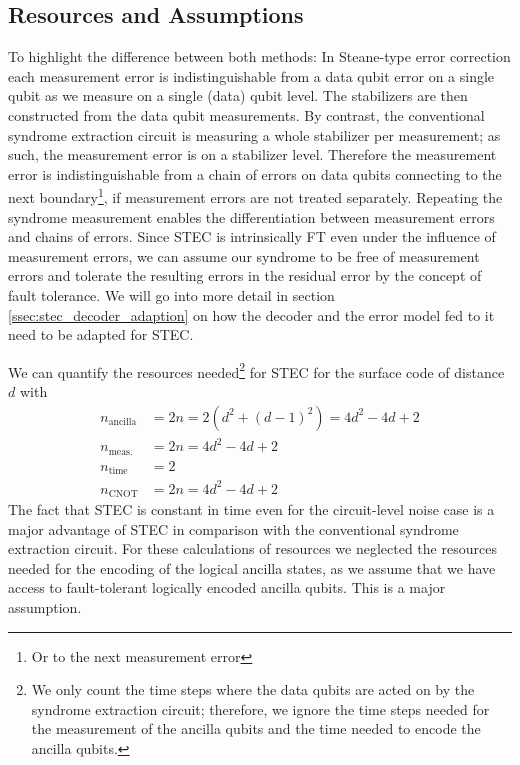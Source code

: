 \subsection{Resources and Assumptions}\label{sssec:assumptions_stec}

To highlight the difference between both methods: 
In Steane-type error correction each measurement error is indistinguishable from a data qubit error on a single qubit as we measure on a single (data) qubit level.
The stabilizers are then constructed from the data qubit measurements.
By contrast, the conventional syndrome extraction circuit is measuring a whole stabilizer per measurement; 
as such, the measurement error is on a stabilizer level. 
Therefore the measurement error is indistinguishable from a chain of errors on data qubits connecting to the next boundary\footnote{Or to the next measurement error}, 
if measurement errors are not treated separately.
Repeating the syndrome measurement enables the differentiation between measurement errors and chains of errors.
Since STEC is intrinsically FT even under the influence of measurement errors, 
we can assume our syndrome to be free of measurement errors and tolerate the resulting errors in the residual error by the concept of fault tolerance.
We will go into more detail in section \ref{ssec:stec_decoder_adaption} on how the decoder and the error model fed to it need to be adapted for STEC. 

We can quantify the resources needed\footnote{
    We only count the time steps where the data qubits are acted on by the syndrome extraction circuit; 
    therefore, we ignore the time steps needed for the measurement of the ancilla qubits 
    and the time needed to encode the ancilla qubits.
} for STEC for the surface code of distance $d$ with
\begin{align}
    n_{\text{ancilla}} &= 2n = 2 (d^2 + (d-1)^2) =  4d^2 -4d +2 \\
    n_{\text{meas.}} &= 2n  = 4d^2 -4d +2 \label{eq:measurements_stec} \\
    n_{\text{time}} &= 2  \\
    n_{\text{CNOT}} &= 2n  =   4d^2 -4d +2 \label{eq:cnot_stec}
\end{align}
The fact that STEC is constant in time even for the circuit-level noise case is a major advantage of STEC in comparison with the conventional syndrome extraction circuit. 
For these calculations of resources we neglected the resources needed for the encoding of the logical ancilla states,
as we assume that we have access to fault-tolerant logically encoded ancilla qubits.
This is a major assumption.


